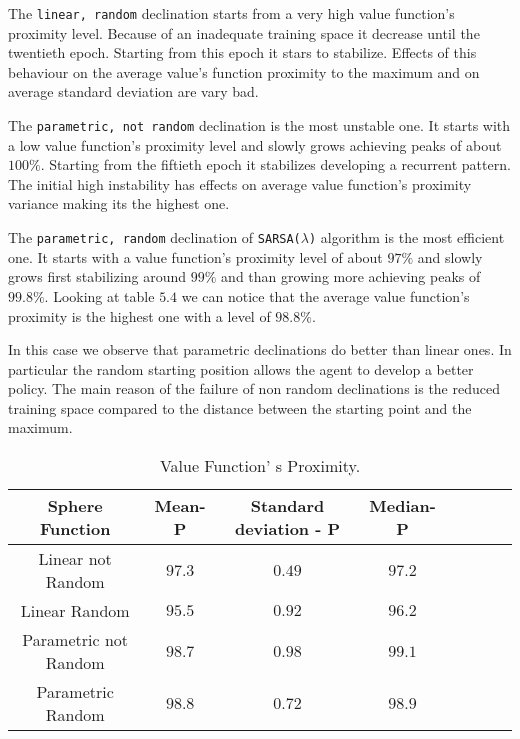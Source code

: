 The {\tt linear, random} declination starts from a very high value function's proximity level. Because of an inadequate training space it decrease until the twentieth epoch. Starting from this epoch it stars to stabilize. Effects of this behaviour on the average value's function proximity to the maximum and on average standard deviation are vary bad.
 
The {\tt parametric, not random} declination is the most unstable one. It starts with a low value function's proximity level and slowly grows achieving peaks of about $100\%$. Starting from the fiftieth epoch it stabilizes developing a recurrent pattern. The initial high instability has effects on average value function's proximity variance making its the highest one.
 
The {\tt parametric, random} declination of {\tt SARSA($\lambda$)} algorithm is the most efficient one. It starts with a value function's proximity level of about $97\%$ and slowly grows first stabilizing around $99\%$ and than growing more achieving peaks of $99.8\%$. Looking at table $5.4$ we can notice that the average value function's proximity is the highest one with a level of $98.8\%$.
 
In this case we observe that parametric declinations do better than linear ones. In particular the random starting position allows the agent to develop a better policy. The main reason of the failure of non random declinations is the reduced training space compared to the distance between the starting point and the maximum.

\begin{table}[h!]
	\centering
	\resizebox{\linewidth}{!} {
	\begin{tabular}{c| ccccccc} 
		\hline \textbf{Sphere Function}
		& \textbf{Mean- P} & \textbf{Standard deviation - P}  &\textbf{Median- P} \\ 
		\hline Linear not Random
		& $97.3$ & \cellcolor{green!25}$0.49$ & $97.2$  \\ 
		\hline Linear Random
		& $95.5$ & $0.92$ & $96.2$ \\ 
		\hline Parametric not Random
		& $98.7$ & $0.98$ & \cellcolor{green!25}$99.1$ \\ 
		\hline Parametric Random
		& \cellcolor{green!25}$98.8$ & $0.72$ & $98.9$ \\ 
		\hline 
	\end{tabular} 
}
\label{ParabolicTabProximity}
\caption{Value Function' s Proximity.} 
\end{table}

